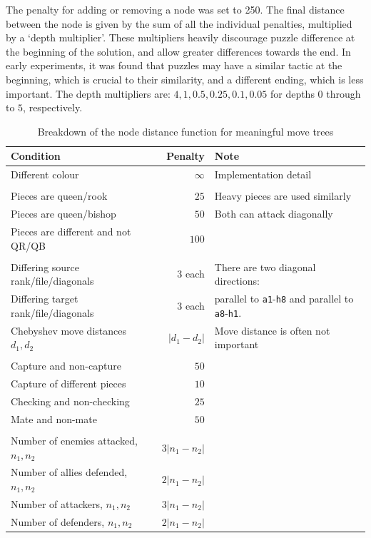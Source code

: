 The penalty for adding or removing a node was set to 250. The final distance
between the node is given by the sum of all the individual penalties,
multiplied by a `depth multiplier'. These multipliers heavily discourage puzzle
difference at the beginning of the solution, and allow greater differences
towards the end. In early experiments, it was found that puzzles may have a
similar tactic at the beginning, which is crucial to their similarity, and a
different ending, which is less important. The depth multipliers are: $4, 1,
0.5, 0.25, 0.1, 0.05$ for depths $0$ through to $5$, respectively.

\begin{table}[H]
  \centering
  \begin{tabular}{lrl}
    Condition & Penalty & Note \\
    \hline
    Different colour & $\infty$ & Implementation detail \\
    &&\\
    Pieces are queen/rook & $25$ & Heavy pieces are used similarly \\
    Pieces are queen/bishop& $50$ & Both can attack diagonally \\
    Pieces are different and not QR/QB& $100$ & \\
    &&\\
    Differing source rank/file/diagonals & $3$ each & There are two diagonal
    directions:\\
    Differing target rank/file/diagonals & $3$ each & parallel to
    \texttt{a1}-\texttt{h8} and parallel to \texttt{a8}-\texttt{h1}. \\
    Chebyshev move distances $d_1, d_2$ & $|d_1-d_2|$ & Move distance is often
    not important \\
    &&\\
    Capture and non-capture & $50$ & \\
    Capture of different pieces & $10$ & \\
    Checking and non-checking & $25$ & \\
    Mate and non-mate & $50$ & \\
    &&\\
    Number of enemies attacked, $n_1, n_2$ & $3|n_1-n_2|$ & \\
    Number of allies defended, $n_1, n_2$ & $2|n_1-n_2|$ & \\
    Number of attackers, $n_1, n_2$ & $3|n_1-n_2|$ & \\
    Number of defenders, $n_1, n_2$ & $2|n_1-n_2|$ & \\
  \end{tabular}
  \caption{Breakdown of the node distance function for meaningful move trees}
  \label{distanceTable}
\end{table}

